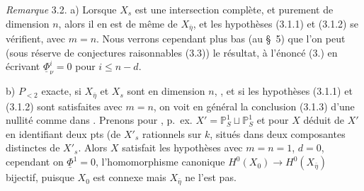 \documentclass[11pt,a4paper]{article}
\begin{document}

\emph{Remarque} 3.2. a) Lorsque $X_s$ est  une intersection complète,
 et purement de dimension $n$, alors 
 il en est de même de $X_{\bar\eta}$, et les hypothèses (3.1.1) et
(3.1.2) se vérifient, avec $m = n$.  Nous verrons cependant plus bas
(au \struck{\ill{}} §~5) que l'on peut (sous réserve de conjectures raisonnables
 (3.3))   le résultat, 
\ill{} à l'énoncé (3.\ill{}) en écrivant $\underline{\Phi}^i_\nu = 0$ pour $i \leq n-d$.

b) $P_{<2}$ exacte, \struck{\ill{}}  si $X_{\bar\eta}$ et $X_s$ sont
  en dimension $n$,
, et si les hypothèses (3.1.1) et (3.1.2) sont satisfaites
 avec $m = n$, on voit  en général 
la conclusion (3.1.3) d'une nullité comme dans .
 Prenons pour \ill{} \struck{\ill{}}, p.~ex. 
 
$X' = \mathbb{P}^1_S \sqcup \mathbb{P}^1_S$ et pour $X$  déduit de $X'$ en
identifiant deux pts  (de $X'_s$ rationnels sur $k$, situés dans deux
composantes distinctes de $X'_s$. Alors  $X$ satisfait les hypothèses
avec $m = n = 1$, $d = 0$, cependant  on 
$\underline{\Phi}^1 = 0$, \struck{\ill{}} l'homomorphisme canonique
$H^0(X_0) \to H^0(X_{\bar\eta})$ \ill{} bijectif, puisque $X_0$ est connexe mais
$X_{\bar\eta}$ ne l'est pas.

\end{document}
